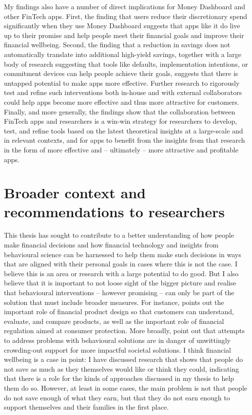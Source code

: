My findings also have a number of direct implications for Money Dashboard and
other FinTech apps. First, the finding that users reduce their discretionary
spend significantly when they use Money Dashboard suggests that apps like it do
live up to their promise and help people meet their financial goals and improve
their financial wellbeing. Second, the finding that a reduction in savings does
not automatically translate into additional high-yield savings, together with a
large body of research suggesting that tools like defaults, implementation
intentions, or commitment devices can help people achieve their goals, suggests
that there is untapped potential to make apps more effective. Further research
to rigorously test and refine such interventions both in-house and with
external collaborators could help apps become more effective and thus more
attractive for customers. Finally, and more generally, the findings show that
the collaboration between FinTech apps and researchers is a win-win strategy
for researchers to develop, test, and refine tools based on the latest
theoretical insights at a large-scale and in relevant contexts, and for
apps to benefit from the insights from that research in the form of more
effective and -- ultimately -- more attractive and profitable apps. 

\section{Broader context {\color{blue} and recommendations to researchers}}

This thesis has sought to contribute to a better understanding of how people make financial decisions and how financial technology and insights from behavioural science can be harnessed to help them make such decisions in ways that are aligned with their personal goals in cases where this is not the case. I believe this is an area or research with a large potential to do good. But I also believe that it is
important to not loose sight of the bigger picture and realise that
behavioural interventions -- however promising -- can only be part of the
solution that must include broader measures. For instance,
\citet{agarwal2017shapes} points out the important role of financial product
design so that customers can understand, evaluate, and compare products, as
well as the important role of financial regulation aimed at consumer
protection. More broadly, \citet{chater2022frame} point out that attempts to
address problems with behavioural solutions are in danger of unwittingly
crowding-out support for more impactful societal solutions. I think financial
wellbeing is a case in point: I have discussed research that shows that people
do not save as much as they themselves would like or think they could, indicating that there is a role for
the kinds of approaches discussed in my thesis to help them do so. However, at
least in some cases, the main problem is not that people do not save
enough of what they earn, but that they do not earn enough to support
themselves and their families in the first place. 

